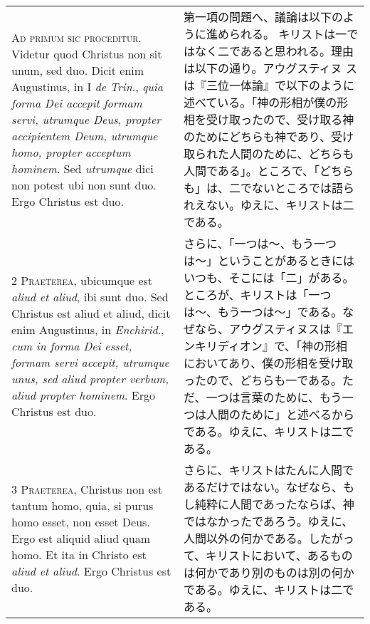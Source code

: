 \documentclass[10pt]{jsarticle} %
\begin{document}
\begin{longtable}{p{21em}p{21em}}

{\Huge A}{\scshape d primum sic proceditur}. Videtur quod
 Christus non sit unum, sed duo. Dicit enim Augustinus, in I {\itshape de Trin}.,
 {\itshape quia forma Dei accepit formam servi, utrumque Deus, propter accipientem
 Deum, utrumque homo, propter acceptum hominem}. Sed {\itshape utrumque} dici non
 potest ubi non sunt duo. Ergo Christus est duo.


&

第一項の問題へ、議論は以下のように進められる。
キリストは一ではなく二であると思われる。理由は以下の通り。アウグスティヌ
 スは『三位一体論』で以下のように述べている。「神の形相が僕の形相を受け取ったので、受け取る神のためにどちらも神であり、受け取られた人間のために、どちらも人間である」。ところで、「どちらも」は、二でないところでは語られえない。ゆえに、キリストは二である。

\\


{\scshape 2 Praeterea}, ubicumque est {\itshape aliud et aliud},
 ibi sunt duo. Sed Christus est aliud et aliud, dicit enim Augustinus,
 in {\itshape Enchirid}., {\itshape cum in forma Dei esset, formam servi accepit, utrumque
 unus, sed aliud propter verbum, aliud propter hominem}. Ergo Christus
 est duo.


&

さらに、「一つは〜、もう一つは〜」ということがあるときにはいつも、そこには「二」がある。
ところが、キリストは「一つは〜、もう一つは〜」である。なぜなら、アウグスティヌスは『エンキリディオン』で、「神の形相においてあり、僕の形相を受け取ったので、どちらも一である。ただ、一つは言葉のために、もう一つは人間のために」と述べるからである。ゆえに、キリストは二である。


\\


{\scshape 3 Praeterea}, Christus non est tantum homo,
 quia, si purus homo esset, non esset Deus. Ergo est aliquid aliud quam
 homo. Et ita in Christo est {\itshape aliud et aliud}. Ergo Christus est duo.


&


さらに、キリストはたんに人間であるだけではない。なぜなら、もし純粋に人間であったならば、神ではなかったであろう。ゆえに、人間以外の何かである。したがって、キリストにおいて、あるものは何かであり別のものは別の何かである。ゆえに、キリストは二である。

\\



\end{longtable}
\end{document}

